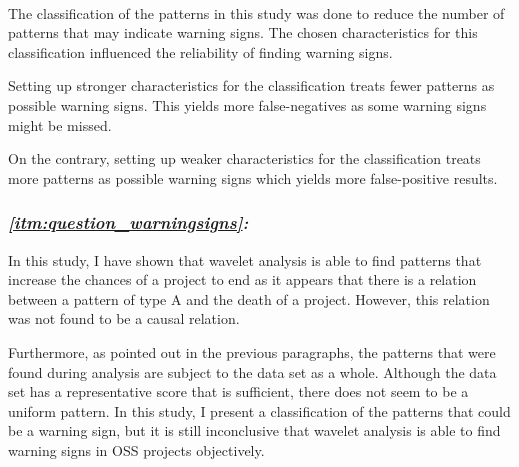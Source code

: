 \paragraph{}
The classification of the patterns in this study was done to reduce the
number of patterns that may indicate warning signs. The chosen characteristics
for this classification influenced the reliability of finding warning signs.

Setting up stronger characteristics for the classification treats fewer
patterns as possible warning signs. This yields more false-negatives as some
warning signs might be missed.

On the contrary, setting up weaker characteristics for the classification treats
more patterns as possible warning signs which yields more false-positive
results.

\subsubsection{\textit{\ref{itm:question_warningsigns}: \researchQuestion}}
In this study, I have shown that wavelet analysis is able to find patterns that
increase the chances of a project to end as it appears that there is a relation
between a pattern of type A and the death of a project. However, this relation
was not found to be a causal relation.

Furthermore, as pointed out in the previous paragraphs, the patterns that were
found during analysis are subject to the data set as a whole. Although the data
set has a representative score that is sufficient, there does not seem to be a
uniform pattern. In this study, I present a classification of the patterns that
could be a warning sign, but it is still inconclusive that wavelet analysis is
able to find warning signs in OSS projects objectively.
